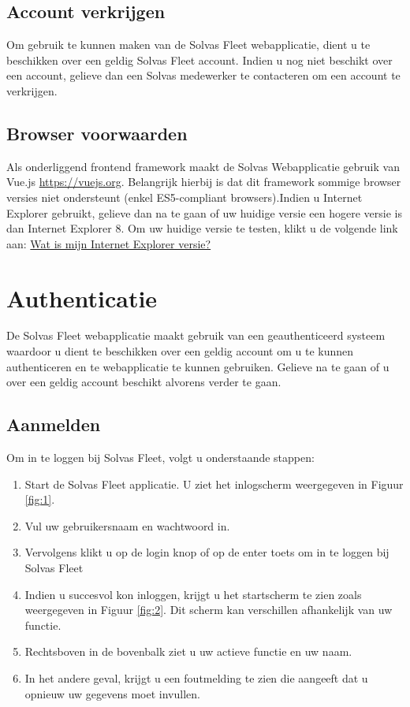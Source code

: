 \documentclass[11pt,openany]{article}
\begin{document}
\subsection{Account verkrijgen}
Om gebruik te kunnen maken van de Solvas Fleet webapplicatie, dient u te beschikken over een geldig Solvas Fleet account. Indien u nog niet beschikt over een account, gelieve dan een Solvas medewerker te contacteren om een account te verkrijgen. 
\subsection{Browser voorwaarden}
Als onderliggend frontend framework maakt de Solvas Webapplicatie gebruik van Vue.js 
\url{https://vuejs.org}. Belangrijk hierbij is dat dit framework sommige browser versies niet ondersteunt (enkel ES5-compliant browsers).Indien u Internet Explorer gebruikt, gelieve dan 
na te gaan of uw huidige versie een hogere versie is dan Internet Explorer 8. Om uw huidige versie te testen, klikt u de volgende
link aan:  \href{https://support.microsoft.com/nl-be/help/17295/windows-internet-explorer-which-version}{Wat is mijn Internet Explorer versie?}
\newpage
\section{Authenticatie}
\label{Authenticatie}
De Solvas Fleet webapplicatie maakt gebruik van een geauthenticeerd systeem 
waardoor u dient te beschikken over een geldig account
om u te kunnen authenticeren en te webapplicatie te kunnen gebruiken. Gelieve na te gaan of u over een geldig account beschikt alvorens verder te gaan.
\subsection{Aanmelden}
Om in te loggen bij Solvas Fleet, volgt u onderstaande stappen:
\begin{enumerate}
	\item Start de Solvas Fleet applicatie. U ziet het inlogscherm weergegeven in Figuur \ref{fig:1}.
	\item Vul uw gebruikersnaam en wachtwoord in.
	\item Vervolgens klikt u op de login knop of op de enter toets om in te loggen bij Solvas Fleet
	\item Indien u succesvol kon inloggen, krijgt u het startscherm te zien zoals weergegeven in Figuur \ref{fig:2}. Dit scherm kan verschillen afhankelijk van uw functie.
	\item Rechtsboven in de bovenbalk ziet u uw actieve functie en uw naam.
	\item In het andere geval, krijgt u een foutmelding te zien die aangeeft dat u opnieuw uw gegevens moet invullen.
\end{enumerate}
\end{document}
